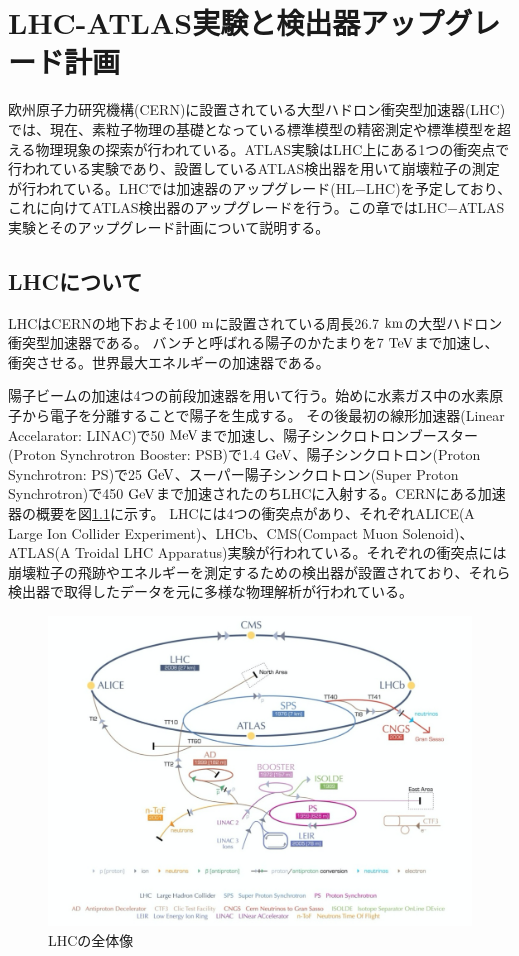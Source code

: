 \chapter{LHC-ATLAS実験と検出器アップグレード計画}
欧州原子力研究機構(CERN)に設置されている大型ハドロン衝突型加速器(LHC)では、現在、素粒子物理の基礎となっている標準模型の精密測定や標準模型を超える物理現象の探索が行われている。ATLAS実験はLHC上にある1つの衝突点で行われている実験であり、設置しているATLAS検出器を用いて崩壊粒子の測定が行われている。LHCでは加速器のアップグレード(HL$-$LHC)を予定しており、これに向けてATLAS検出器のアップグレードを行う。この章ではLHC$-$ATLAS実験とそのアップグレード計画について説明する。

\section{LHCについて}
LHCはCERNの地下およそ100 $\rm{m}$に設置されている周長26.7 $\rm{km}$の大型ハドロン衝突型加速器である。
バンチと呼ばれる陽子のかたまりを7 $\rm{TeV}$まで加速し、衝突させる。世界最大エネルギーの加速器である。

陽子ビームの加速は4つの前段加速器を用いて行う。始めに水素ガス中の水素原子から電子を分離することで陽子を生成する。
その後最初の線形加速器(Linear Accelarator: LINAC)で50 $\rm{MeV}$まで加速し、陽子シンクロトロンブースター(Proton Synchrotron Booster: PSB)で1.4 $\rm{GeV}$、陽子シンクロトロン(Proton Synchrotron: PS)で25 $\rm{GeV}$、スーパー陽子シンクロトロン(Super Proton Synchrotron)で450 $\rm{GeV}$まで加速されたのちLHCに入射する。CERNにある加速器の概要を図\ref{LHC_overview}に示す。
LHCには4つの衝突点があり、それぞれALICE(A Large Ion Collider Experiment)、LHCb、CMS(Compact Muon Solenoid)、ATLAS(A
Troidal LHC Apparatus)実験が行われている。それぞれの衝突点には崩壊粒子の飛跡やエネルギーを測定するための検出器が設置されており、それら検出器で取得したデータを元に多様な物理解析が行われている。

\begin{figure}[bpt]\centering
\includegraphics[width=12cm]{LHC_overview}
\caption[LHCの全体像]{LHCの全体像\cite{1-1}}
\label{LHC_overview}
\end{figure}

